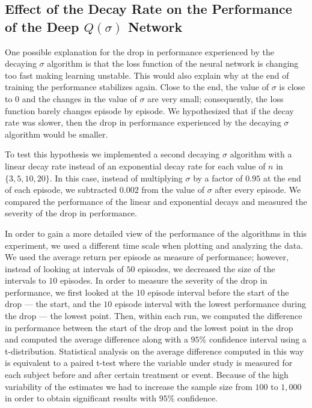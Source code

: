 \subsection{Effect of the Decay Rate on the Performance of the Deep $Q(\sigma)$ Network}

One possible explanation for the drop in performance experienced by the decaying $\sigma$ algorithm is that the loss function of the neural network is changing too fast making learning unstable.
This would also explain why at the end of training the performance stabilizes again.
Close to the end, the value of $\sigma$ is close to $0$ and the changes in the value of $\sigma$ are very small; consequently, the loss function barely changes episode by episode.
We hypothesized that if the decay rate was slower, then the drop in performance experienced by the decaying $\sigma$ algorithm would be smaller.

To test this hypothesis we implemented a second decaying $\sigma$ algorithm with a linear decay rate instead of an exponential decay rate for each value of $n$ in $\{3, 5, 10, 20\}$.
In this case, instead of multiplying $\sigma$ by a factor of $0.95$ at the end of each episode, we subtracted $0.002$ from the value of $\sigma$ after every episode.
We compared the performance of the linear and exponential decays and measured the severity of the drop in performance.

In order to gain a more detailed view of the performance of the algorithms in this experiment, we used a different time scale when plotting and analyzing the data.
We used the average return per episode as measure of performance; however, instead of looking at intervals of $50$ episodes, we decreased the size of the intervals to $10$ episodes.
In order to measure the severity of the drop in performance, we first looked at the $10$ episode interval before the start of the drop --- the start, and the $10$ episode interval with the lowest performance during the drop --- the lowest point.
Then, within each run, we computed the difference in performance between the start of the drop and the lowest point in the drop and computed the average difference along with a $95\%$ confidence interval using a t-distribution.
Statistical analysis on the average difference computed in this way is equivalent to a paired t-test where the variable under study is measured for each subject before and after certain treatment or event.
Because of the high variability of the estimates we had to increase the sample size from $100$ to $1,000$ in order to obtain significant results with $95\%$ confidence.

